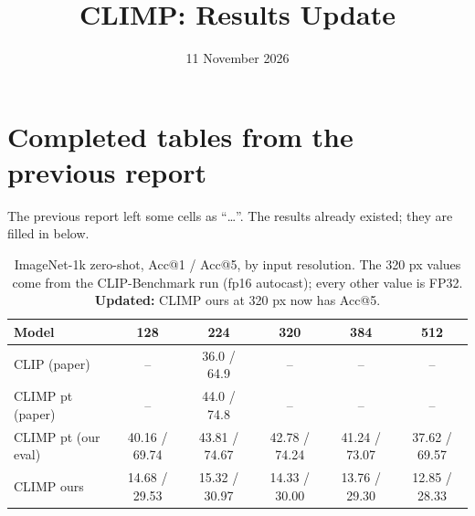 \documentclass[a4paper,10pt]{article}
\title{CLIMP: Results Update}
\author{}
\date{11 November 2026}
\begin{document}
\maketitle

\section{Completed tables from the previous report}
The previous report left some cells as ``\ldots''. The results already existed; they are filled in below.

\setcounter{table}{2}

\begin{table}[!htbp]
\centering
\caption{ImageNet-1k zero-shot, Acc@1 / Acc@5, by input resolution. The 320 px values come from the CLIP-Benchmark run (fp16 autocast); every other value is FP32. \textbf{Updated:} CLIMP ours at 320 px now has Acc@5.}
\label{tab:imagenet-res}
\begin{tabular}{lccccc}
\toprule
Model & 128 & 224 & 320 & 384 & 512 \\
\midrule
CLIP (paper)         & --            & 36.0 / 64.9   & --            & --            & --            \\
CLIMP pt (paper)     & --            & 44.0 / 74.8   & --            & --            & --            \\
CLIMP pt (our eval)  & 40.16 / 69.74 & 43.81 / 74.67 & 42.78 / 74.24 & 41.24 / 73.07 & 37.62 / 69.57 \\
CLIMP ours           & 14.68 / 29.53 & 15.32 / 30.97 & 14.33 / 30.00 & 13.76 / 29.30 & 12.85 / 28.33 \\
\bottomrule
\end{tabular}
\end{table}
\end{document}
